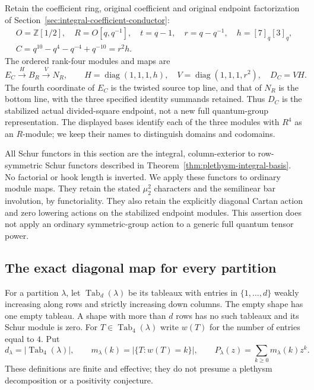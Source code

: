 Retain the coefficient ring, original coefficient and original endpoint
factorization of Section~\ref{sec:integral-coefficient-conductor}:
\begin{gather*}
 O=\mathbb Z[1/2],\quad R=O[q,q^{-1}],\quad t=q-1,\quad
 r=q-q^{-1},\quad h=[7]_q[3]_q,\\
 C=q^{10}-q^4-q^{-4}+q^{-10}=r^2h.
\end{gather*}
The ordered rank-four modules and maps are
\[
 E_C\xrightarrow{H}B_R\xrightarrow{V}N_R,\qquad
 H=\operatorname{diag}(1,1,1,h),\quad
 V=\operatorname{diag}(1,1,1,r^2),\quad D_C=VH.
\]
The fourth coordinate of $E_C$ is the twisted source top line,
and that of $N_R$ is the bottom line, with the three specified identity
summands retained. Thus $D_C$ is the stabilized actual divided-square
endpoint, not a new full quantum-group representation. The displayed
bases identify each of the three modules with $R^4$ as an $R$-module;
we keep their names to distinguish domains and codomains.

All Schur functors in this section are the integral, column-exterior to
row-symmetric Schur functors described in
Theorem~\ref{thm:plethysm-integral-basis}. No factorial or hook
length is inverted. We apply these functors to ordinary module maps.
They retain the stated $\mu_2^2$ characters and the semilinear bar
involution, by functoriality. They also retain the explicitly diagonal
Cartan action and zero lowering actions on the stabilized endpoint
modules. This assertion does not apply an ordinary symmetric-group
action to a generic full quantum tensor power.

\subsection{The exact diagonal map for every partition}

For a partition $\lambda$, let $\operatorname{Tab}_d(\lambda)$ be its
tableaux with entries in $\{1,\ldots,d\}$ weakly increasing along rows
and strictly increasing down columns. The empty shape has one empty
tableau. A shape with more than $d$ rows has no such tableaux and its
Schur module is zero. For $T\in\operatorname{Tab}_4(\lambda)$ write
$w(T)$ for the number of entries equal to $4$. Put
\[
 d_\lambda=|\operatorname{Tab}_4(\lambda)|,\qquad
 m_\lambda(k)=|\{T:w(T)=k\}|,
 \qquad P_\lambda(z)=\sum_{k\ge0}m_\lambda(k)z^k.
\]
These definitions are finite and effective; they do not presume a
plethysm decomposition or a positivity conjecture.

